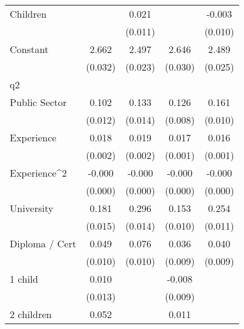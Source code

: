{\begin{tabular}{l*{4}{c}}
Children            &                     &       0.021\sym{*}  &                     &      -0.003         \\
                    &                     &     (0.011)         &                     &     (0.010)         \\
Constant            &       2.662\sym{***}&       2.497\sym{***}&       2.646\sym{***}&       2.489\sym{***}\\
                    &     (0.032)         &     (0.023)         &     (0.030)         &     (0.025)         \\
\hline
q2                  &                     &                     &                     &                     \\
Public Sector       &       0.102\sym{***}&       0.133\sym{***}&       0.126\sym{***}&       0.161\sym{***}\\
                    &     (0.012)         &     (0.014)         &     (0.008)         &     (0.010)         \\
Experience          &       0.018\sym{***}&       0.019\sym{***}&       0.017\sym{***}&       0.016\sym{***}\\
                    &     (0.002)         &     (0.002)         &     (0.001)         &     (0.001)         \\
Experience^{2}      &      -0.000\sym{***}&      -0.000\sym{***}&      -0.000\sym{***}&      -0.000\sym{***}\\
                    &     (0.000)         &     (0.000)         &     (0.000)         &     (0.000)         \\
University          &       0.181\sym{***}&       0.296\sym{***}&       0.153\sym{***}&       0.254\sym{***}\\
                    &     (0.015)         &     (0.014)         &     (0.010)         &     (0.011)         \\
Diploma / Cert      &       0.049\sym{***}&       0.076\sym{***}&       0.036\sym{***}&       0.040\sym{***}\\
                    &     (0.010)         &     (0.010)         &     (0.009)         &     (0.009)         \\
1 child             &       0.010         &                     &      -0.008         &                     \\
                    &     (0.013)         &                     &     (0.009)         &                     \\
2 children          &       0.052\sym{***}&                     &       0.011         &                     \\

\end{tabular}}
